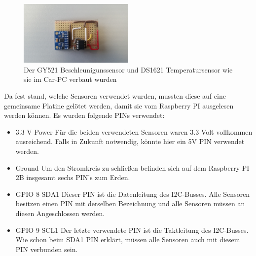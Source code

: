 \begin{figure}[!htb]\centering
	\includegraphics[width=0.5\textwidth]{images/sensoren}
	\caption{Der GY521 Beschleunigunssensor und DS1621 Temperatursensor wie sie im Car-PC verbaut wurden}
	\label{Fig:sensoren}
\end{figure}
Da fest stand, welche Sensoren verwendet wurden, mussten diese auf eine gemeinsame Platine gelötet werden, damit sie vom Raspberry PI ausgelesen werden können. Es wurden folgende PINs verwendet:
\begin{itemize}
\item 3.3 V Power \newline
Für die beiden verwendeten Sensoren waren 3.3 Volt vollkommen ausreichend. Falls in Zukunft notwendig, könnte hier ein 5V PIN verwendet werden.
\item Ground \newline
Um den Stromkreis zu schließen befinden sich auf dem Raspberry PI 2B insgesamt sechs PIN's zum Erden.
\item GPIO 8 SDA1 \newline
Dieser PIN ist die Datenleitung des I2C-Busses. Alle Sensoren besitzen einen PIN mit derselben Bezeichnung und alle Sensoren müssen an diesen Angeschlossen werden.
\item GPIO 9 SCL1 \newline
Der letzte verwendete PIN ist die Taktleitung des I2C-Busses. Wie schon beim SDA1 PIN erklärt, müssen alle Sensoren auch mit diesem PIN verbunden sein.
\end{itemize}

